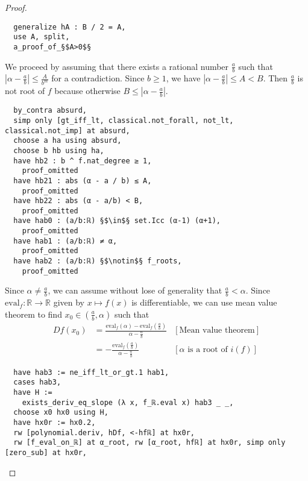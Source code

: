 \documentclass{report}
\theoremstyle{definition}
\theoremstyle{plain}
\begin{document}
\begin{proof}
\begin{verbatim}
  generalize hA : B / 2 = A,
  use A, split,
  a_proof_of_§$A>0$§
\end{verbatim}

We proceed by assuming that there exists a rational number $\frac a b$ such that $\left|\alpha-\frac a b\right|\le\frac A{b^m}$ for a contradiction. Since $b\ge 1$, we have $\left|\alpha-\frac ab\right|\le A < B$. Then $\frac a b$ is not root of $f$ because otherwise $B\le \left|\alpha-\frac ab\right|$.

\begin{verbatim}
  by_contra absurd, 
  simp only [gt_iff_lt, classical.not_forall, not_lt, classical.not_imp] at absurd,
  choose a ha using absurd,
  choose b hb using ha,                               
  have hb2 : b ^ f.nat_degree ≥ 1,
    proof_omitted
  have hb21 : abs (α - a / b) ≤ A, 
    proof_omitted
  have hb22 : abs (α - a/b) < B,
    proof_omitted
  have hab0 : (a/b:ℝ) §$\in$§ set.Icc (α-1) (α+1),
    proof_omitted
  have hab1 : (a/b:ℝ) ≠ α,
    proof_omitted
  have hab2 : (a/b:ℝ) §$\notin$§ f_roots,
    proof_omitted
\end{verbatim}

Since $\alpha\ne \frac a b$, we can assume without lose of generality that $\frac a b < \alpha$. Since $\mathrm{eval}_f:\mathbb R\to \mathbb R$ given by $x\mapsto f(x)$ is differentiable, we can use mean value theorem to find $x_0\in(\frac ab, \alpha)$ such that 
\begin{equation*}
\begin{aligned}
  Df(x_0)&=\frac{\mathrm{eval}_f(\alpha)-\mathrm{eval}_f(\frac ab)}{\alpha-\frac ab} & [\text{Mean value theorem}]\\
         &=-\frac{\mathrm{eval}_f(\frac ab)}{\alpha-\frac ab} & [\alpha\text{ is a root of } i(f)]
\end{aligned}
\end{equation*}

\begin{verbatim}
  have hab3 := ne_iff_lt_or_gt.1 hab1,
  cases hab3,
  have H := 
    exists_deriv_eq_slope (λ x, f_ℝ.eval x) hab3 _ _, 
  choose x0 hx0 using H,
  have hx0r := hx0.2,
  rw [polynomial.deriv, hDf, <-hfℝ] at hx0r,
  rw [f_eval_on_ℝ] at α_root, rw [α_root, hfℝ] at hx0r, simp only [zero_sub] at hx0r,
\end{verbatim}


\end{proof}
\end{document}

